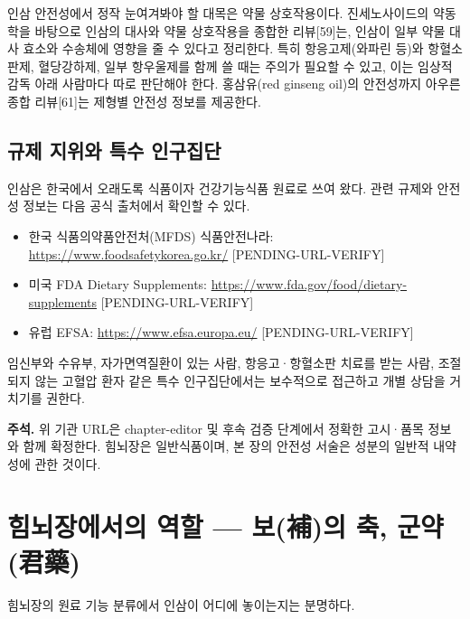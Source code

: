 \documentclass[12pt,oneside]{book}
\newenvironment{authnote}
  {\par\smallskip\begingroup\leftskip=6mm\rightskip=3mm\small\color{muted}\noindent\ignorespaces}
  {\par\endgroup\smallskip}
\begin{document}
인삼 안전성에서 정작 눈여겨봐야 할 대목은 약물 상호작용이다. 진세노사이드의 약동학을 바탕으로 인삼의 대사와 약물 상호작용을 종합한 리뷰[59]는, 인삼이 일부 약물 대사 효소와 수송체에 영향을 줄 수 있다고 정리한다. 특히 항응고제(와파린 등)와 항혈소판제, 혈당강하제, 일부 항우울제를 함께 쓸 때는 주의가 필요할 수 있고, 이는 임상적 감독 아래 사람마다 따로 판단해야 한다. 홍삼유(red ginseng oil)의 안전성까지 아우른 종합 리뷰[61]는 제형별 안전성 정보를 제공한다.

\subsection{규제 지위와 특수 인구집단}

인삼은 한국에서 오래도록 식품이자 건강기능식품 원료로 쓰여 왔다. 관련 규제와 안전성 정보는 다음 공식 출처에서 확인할 수 있다.

\begin{itemize}[leftmargin=6mm,itemsep=1pt,topsep=2pt]
  \item 한국 식품의약품안전처(MFDS) 식품안전나라: \url{https://www.foodsafetykorea.go.kr/} [PENDING-URL-VERIFY]
  \item 미국 FDA Dietary Supplements: \url{https://www.fda.gov/food/dietary-supplements} [PENDING-URL-VERIFY]
  \item 유럽 EFSA: \url{https://www.efsa.europa.eu/} [PENDING-URL-VERIFY]
\end{itemize}

임신부와 수유부, 자가면역질환이 있는 사람, 항응고·항혈소판 치료를 받는 사람, 조절되지 않는 고혈압 환자 같은 특수 인구집단에서는 보수적으로 접근하고 개별 상담을 거치기를 권한다.

\begin{authnote}\textbf{주석.} 위 기관 URL은 chapter-editor 및 후속 검증 단계에서 정확한 고시·품목 정보와 함께 확정한다. 힘뇌장은 일반식품이며, 본 장의 안전성 서술은 성분의 일반적 내약성에 관한 것이다.\end{authnote}

\section{힘뇌장에서의 역할 — 보(補)의 축, 군약(君藥)}

힘뇌장의 원료 기능 분류에서 인삼이 어디에 놓이는지는 분명하다.

\vspace{2pt}\vspace{3pt}
\end{document}
